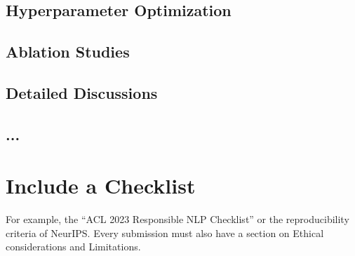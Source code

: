 \documentclass[sigconf, review, nonacm]{acmart}
\begin{document}
\subsection{Hyperparameter Optimization}
\label{appendix:hyperparameteroptimization}

\subsection{Ablation Studies}
\label{appendix:ablationstudies}

\subsection{Detailed Discussions}
\label{appendix:detaileddiscussion}

\subsection{...}




\section{Include a Checklist}


For example, the ``ACL 2023 Responsible NLP Checklist'' or the reproducibility criteria of NeurIPS.
Every submission must also have a section on Ethical considerations and Limitations.
\end{document}
